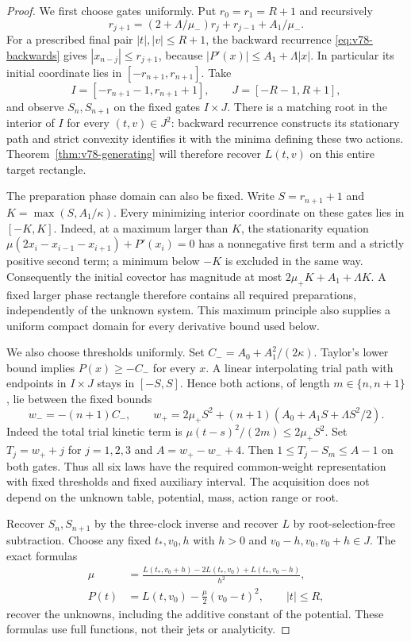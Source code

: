 \begin{proof}
We first choose gates uniformly.  Put $r_0=r_1=R+1$ and recursively
\[
 r_{j+1}=(2+\Lambda/\mu_-)r_j+r_{j-1}+A_1/\mu_-.
\]
For a prescribed final pair $|t|,|v|\le R+1$, the backward recurrence
\eqref{eq:v78-backwards} gives $|x_{n-j}|\le r_{j+1}$, because
$|P'(x)|\le A_1+\Lambda|x|$.  In particular its initial coordinate
lies in $[-r_{n+1},r_{n+1}]$.  Take
\[
 I=[-r_{n+1}-1,r_{n+1}+1],\qquad J=[-R-1,R+1],
\]
and observe $S_n,S_{n+1}$ on the fixed gates $I\times J$.
There is a matching root in the interior of $I$ for every $(t,v)\in
J^2$: backward recurrence constructs its stationary path and strict
convexity identifies it with the minima defining these two actions.
Theorem~\ref{thm:v78-generating} will therefore recover $L(t,v)$
on this entire target rectangle.

The preparation phase domain can also be fixed.  Write $S=r_{n+1}+1$
and $K=\max(S,A_1/\kappa)$.  Every minimizing interior coordinate on
these gates lies in $[-K,K]$.  Indeed, at a maximum larger than $K$,
the stationarity equation
$\mu(2x_i-x_{i-1}-x_{i+1})+P'(x_i)=0$ has a nonnegative first term
and a strictly positive second term; a minimum below $-K$ is excluded
in the same way.  Consequently the initial covector has magnitude at
most $2\mu_+K+A_1+\Lambda K$.  A fixed larger phase rectangle therefore
contains all required preparations, independently of the unknown
system.  This maximum principle also supplies a uniform compact domain
for every derivative bound used below.

We also choose thresholds uniformly.  Set
$C_-=A_0+A_1^2/(2\kappa)$.  Taylor's lower bound implies
$P(x)\ge-C_-$ for every $x$.  A linear interpolating trial path with
endpoints in $I\times J$ stays in $[-S,S]$.  Hence both actions, of
length $m\in\{n,n+1\}$, lie between the fixed bounds
\[
 w_-=-(n+1)C_-,\qquad
 w_+=2\mu_+S^2+(n+1)(A_0+A_1S+\Lambda S^2/2).
\]
Indeed the total trial kinetic term is
$\mu(t-s)^2/(2m)\le2\mu_+S^2$.  Set
$T_j=w_++j$ for $j=1,2,3$ and $A=w_+-w_-+4$.
Then $1\le T_j-S_m\le A-1$ on both gates.  Thus all six laws have
the required common-weight representation with fixed thresholds and
fixed auxiliary interval.  The acquisition does not depend on the
unknown table, potential, mass, action range or root.

Recover $S_n,S_{n+1}$ by the three-clock inverse and recover $L$ by
root-selection-free subtraction.  Choose any fixed $t_*,v_0,h$ with
$h>0$ and $v_0-h,v_0,v_0+h\in J$.  The exact formulas
\begin{align}
 \mu&=\frac{L(t_*,v_0+h)-2L(t_*,v_0)+L(t_*,v_0-h)}{h^2},
       \label{eq:v78-mass-recovery}\\
 P(t)&=L(t,v_0)-\frac{\mu}{2}(v_0-t)^2,
             \qquad |t|\le R,\label{eq:v78-potential-recovery}
\end{align}
recover the unknowns, including the additive constant of the potential.
These formulas use full functions, not their jets or analyticity.


\end{proof}
